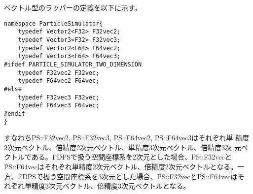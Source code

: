 ベクトル型のラッパーの定義を以下に示す。
\begin{lstlisting}[caption=vectorwrapper]
namespace ParticleSimulator{
    typedef Vector2<F32> F32vec2;
    typedef Vector3<F32> F32vec3;
    typedef Vector2<F64> F64vec2;
    typedef Vector3<F64> F64vec3;
#ifdef PARTICLE_SIMULATOR_TWO_DIMENSION
    typedef F32vec2 F32vec;
    typedef F64vec2 F64vec;
#else
    typedef F32vec3 F32vec;
    typedef F64vec3 F64vec;
#endif
}
\end{lstlisting}

すなわちPS::F32vec2, PS::F32vec3, PS::F64vec2, PS::F64vec3はそれぞれ単
精度2次元ベクトル、倍精度2次元ベクトル、単精度3次元ベクトル、倍精度3次
元ベクトルである。FDPSで扱う空間座標系を2次元とした場合、PS::F32vecと
PS::F64vecはそれぞれ単精度2次元ベクトル、倍精度2次元ベクトルとなる。一
方、FDPSで扱う空間座標系を3次元とした場合、PS::F32vecとPS::F64vecはそ
れぞれ単精度3次元ベクトル、倍精度3次元ベクトルとなる。

